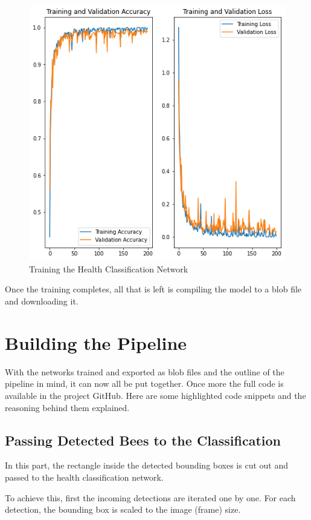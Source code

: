 \documentclass[a4paper,titlepage]{article}
\begin{document}
\begin{figure}[H]
    \includegraphics[width=\textwidth]{training.png}
    \caption{Training the Health Classification Network}
\end{figure}

Once the training completes, all that is left is compiling the model to a blob file and downloading it.

\newpage
\section{Building the Pipeline}

With the networks trained and exported as blob files and the outline of the pipeline in mind, it can now all be put together.
Once more the full code is available in the project GitHub.
Here are some highlighted code snippets and the reasoning behind them explained.

\subsection{Passing Detected Bees to the Classification}

In this part, the rectangle inside the detected bounding boxes is cut out and passed to the health classification network.

To achieve this, first the incoming detections are iterated one by one.
For each detection, the bounding box is scaled to the image (frame) size.
\end{document}

